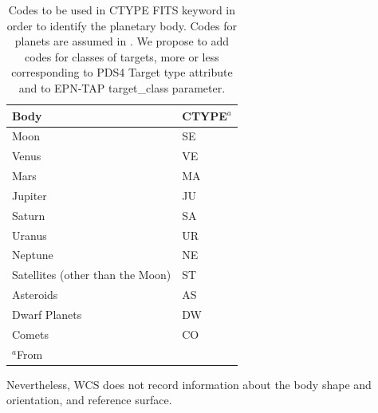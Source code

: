 \begin{table}
\label{table:ctype}
\caption{Codes to be used in CTYPE FITS keyword in order to identify the planetary body.
Codes for planets are assumed in \citet{calagreisenI}. We propose to add codes for classes of targets,
more or less corresponding to PDS4 Target type attribute and to EPN-TAP target\_class parameter.}
\centering
\begin{tabular}{l l}
\hline
Body & CTYPE$^{a}$ \\ 
\hline
Moon & SE \\
Venus & VE \\
Mars & MA \\
Jupiter & JU \\
Saturn & SA \\
Uranus & UR \\
Neptune & NE \\
Satellites (other than the Moon) & ST \\
Asteroids & AS \\
Dwarf Planets & DW \\
Comets & CO \\
\hline
\multicolumn{2}{l}{$^{a}$From \citet{calagreisenI}}
\end{tabular}
\end{table}

Nevertheless, WCS does not record information about the body shape and
orientation, and reference surface.

